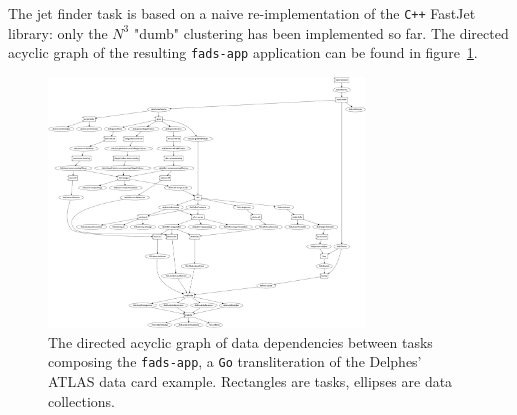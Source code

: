 \documentclass[a4paper]{jpconf}
\begin{document}
The jet finder task is based on a naive re-implementation of the \texttt{C++} FastJet~\cite{ref-fastjet} library: only the $N^3$ "dumb" clustering has been implemented so far.
The directed acyclic graph of the resulting \texttt{fads-app} application can be found in figure~\ref{fig-dflow}.

\begin{figure}[h]
	\begin{center}
 \includegraphics[width=0.75\textwidth]{figs/fads-dflow.png}
	\end{center}
	\caption{\label{fig-dflow}The directed acyclic graph of data dependencies between tasks composing the \texttt{fads-app}, a \texttt{Go} transliteration of the Delphes' ATLAS data card example. Rectangles are tasks, ellipses are data collections.}
\end{figure}
\end{document}
